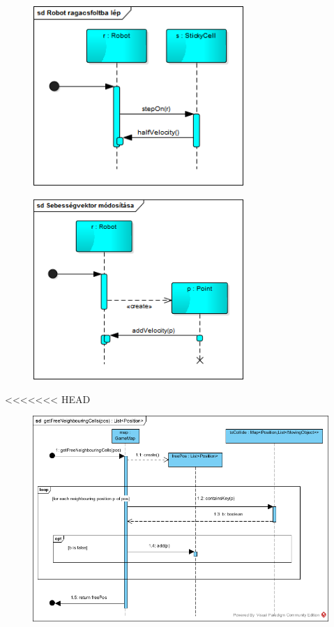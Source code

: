 \begin{figure}[!htbp]
	\begin{center}
		\includegraphics[width=80mm, center]{./chapters/chapter04/robotragacsbalep.png}
		\caption{}
	\end{center}
\end{figure}

\begin{figure}[!htbp]
	\begin{center}
		\includegraphics[width=80mm, center]{./chapters/chapter04/sebesseg.png}
		\caption{}
	\end{center}
\end{figure}

<<<<<<< HEAD
\begin{figure}[!htbp]
	\begin{center}
		\includegraphics[width=166mm, center]{./chapters/chapter04/szabadszomszedok.png}
		\caption{}
	\end{center}
\end{figure}

